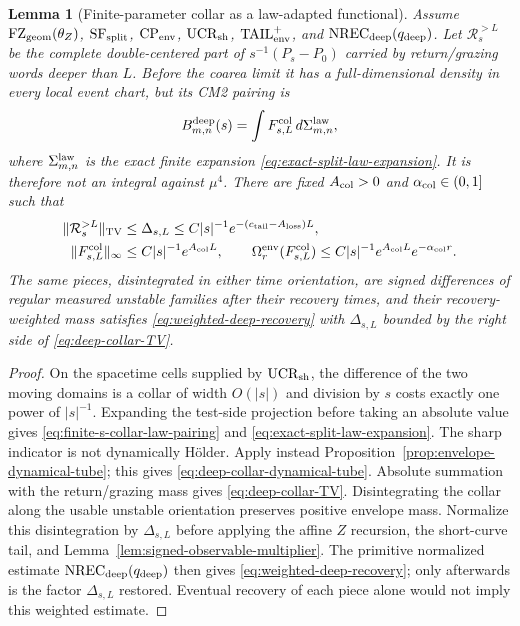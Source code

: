\documentclass[11pt]{article}
\newtheorem{lemma}[theorem]{Lemma}
\begin{document}
\begin{lemma}[Finite-parameter collar as a law-adapted functional]
\label{lem:finite-s-collar-admissibility}
Assume $\mathrm{FZ}_{\rm geom}(\theta_Z)$,
$\mathrm{SF}_{\rm split}$, $\mathrm{CP}_{\rm env}$,
$\mathrm{UCR}_{\rm sh}$, $\mathrm{TAIL}_{\rm env}^{+}$, and
$\mathrm{NREC}_{\rm deep}(q_{\rm deep})$.
Let $\mathcal R_s^{>L}$ be the complete double-centered part of
$s^{-1}(P_s-P_0)$ carried by return/grazing words deeper than $L$.  Before
the coarea limit it has a full-dimensional density in every local event chart,
but its CM2 pairing is
\begin{equation}
\label{eq:finite-s-collar-law-pairing}
 B^{\rm deep}_{m,n}(s)=
 \int F_{s,L}^{\rm col}\,d\Sigma_{m,n}^{\rm law},
\end{equation}
where $\Sigma_{m,n}^{\rm law}$ is the exact finite expansion
\eqref{eq:exact-split-law-expansion}.  It is therefore not an integral against
$\mu^4$.
There are fixed $A_{\rm col}>0$ and $\alpha_{\rm col}\in(0,1]$ such that
\begin{align}
 \|\mathcal R_s^{>L}\|_{\rm TV}
 &\le \Delta_{s,L}\le C|s|^{-1}e^{-(c_{\rm tail}-A_{\rm loss})L},
 \label{eq:deep-collar-TV}\\
 \|F_{s,L}^{\rm col}\|_\infty
 &\le C|s|^{-1}e^{A_{\rm col}L},\qquad
 \Omega_r^{\rm env}(F_{s,L}^{\rm col})
 \le C|s|^{-1}e^{A_{\rm col}L}e^{-\alpha_{\rm col}r}.
 \label{eq:deep-collar-dynamical-tube}
\end{align}
The same pieces, disintegrated in either time orientation, are signed
differences of regular measured unstable families after their recovery
times, and their recovery-weighted mass satisfies
\eqref{eq:weighted-deep-recovery} with
$\Delta_{s,L}$ bounded by the right side of
\eqref{eq:deep-collar-TV}.
\end{lemma}

\begin{proof}
On the spacetime cells supplied by $\mathrm{UCR}_{\rm sh}$, the difference of the two moving domains is
a collar of width $O(|s|)$ and division by $s$ costs exactly one power of
$|s|^{-1}$.  Expanding the test-side projection before taking an absolute
value gives \eqref{eq:finite-s-collar-law-pairing} and
\eqref{eq:exact-split-law-expansion}.  The sharp indicator is not dynamically
H\"older.  Apply instead Proposition~\ref{prop:envelope-dynamical-tube}; this gives
\eqref{eq:deep-collar-dynamical-tube}.  Absolute summation with the
return/grazing mass gives \eqref{eq:deep-collar-TV}.  Disintegrating the collar
along the usable unstable orientation preserves positive envelope mass.
Normalize this disintegration by $\Delta_{s,L}$ before applying the affine $Z$ recursion,
the short-curve tail, and Lemma~\ref{lem:signed-observable-multiplier}.
The primitive normalized estimate
$\mathrm{NREC}_{\rm deep}(q_{\rm deep})$ then gives
\eqref{eq:weighted-deep-recovery}; only afterwards is the factor
$\Delta_{s,L}$ restored.  Eventual recovery of each piece alone would not
imply this weighted estimate.
\end{proof}
\end{document}
